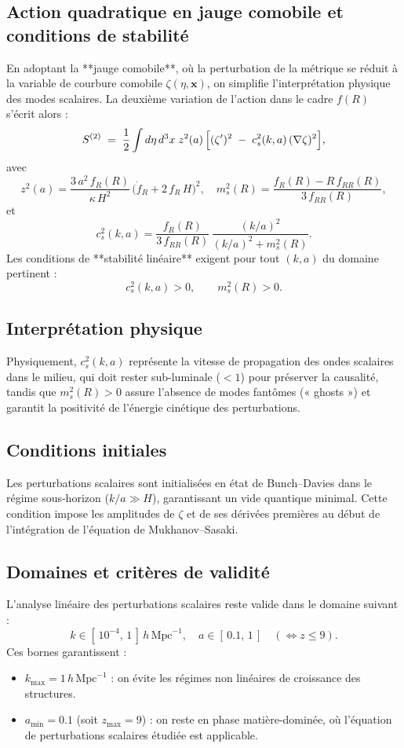 \subsection{Action quadratique en jauge comobile et conditions de stabilité}
En adoptant la **jauge comobile**, où la perturbation de la métrique se réduit à la variable de courbure comobile \(\zeta(\eta,\mathbf{x})\), on simplifie l’interprétation physique des modes scalaires. La deuxième variation de l’action dans le cadre \(f(R)\) s’écrit alors :
\[
  S^{(2)} \;=\; \frac{1}{2}\int d\eta\,d^{3}x\;z^{2}(a)\,
    \Bigl[(\zeta')^{2} \;-\; c_{s}^{2}(k,a)\,(\nabla\zeta)^{2}\Bigr],
\]
avec
\[
  z^{2}(a)
  =
  \frac{3\,a^{2}\,f_{R}(R)}{\kappa\,H^{2}}\,
  \bigl(\dot f_{R} + 2\,f_{R}\,H\bigr)^{2},
  \quad
  m_{s}^{2}(R)
  =
  \frac{f_{R}(R) - R\,f_{RR}(R)}{3\,f_{RR}(R)},
\]
et
\[
  c_{s}^{2}(k,a)
  =
  \frac{f_{R}(R)}{3\,f_{RR}(R)}
  \,\frac{(k/a)^{2}}{(k/a)^{2} + m_{s}^{2}(R)}.
\]
Les conditions de **stabilité linéaire** exigent pour tout \((k,a)\) du domaine pertinent :
\[
  c_{s}^{2}(k,a) > 0,
  \qquad
  m_{s}^{2}(R) > 0.
\]

\subsection{Interprétation physique}
Physiquement, \(c_{s}^{2}(k,a)\) représente la vitesse de propagation des ondes scalaires dans le milieu, qui doit rester sub-luminale (\(<1\)) pour préserver la causalité, tandis que \(m_{s}^{2}(R)>0\) assure l’absence de modes fantômes (« ghosts ») et garantit la positivité de l’énergie cinétique des perturbations.

\subsection{Conditions initiales}
Les perturbations scalaires sont initialisées en état de Bunch–Davies dans le régime sous-horizon (\(k/a \gg H\)), garantissant un vide quantique minimal.
Cette condition impose les amplitudes de \(\zeta\) et de ses dérivées premières au début de l’intégration de l’équation de Mukhanov–Sasaki.

\subsection{Domaines et critères de validité}
L’analyse linéaire des perturbations scalaires reste valide dans le domaine suivant :
\[
  k \in [\,10^{-4},\,1\,]\,h\,\mathrm{Mpc}^{-1},
  \quad
  a \in [\,0.1,\,1\,]
  \quad(\Leftrightarrow z \le 9).
\]
Ces bornes garantissent :
\begin{itemize}
  \item \(k_{\max}=1\,h\,\mathrm{Mpc}^{-1}\) : on évite les régimes non linéaires de croissance des structures.
  \item \(a_{\min}=0.1\) (soit \(z_{\max}=9\)) : on reste en phase matière-dominée, où l’équation de perturbations scalaires étudiée est applicable.
\end{itemize}

